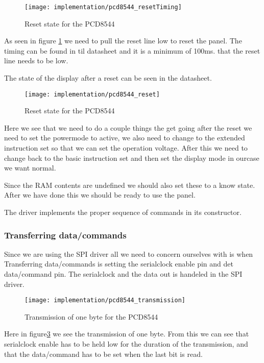 \begin{figure}
	\centering
	\texttt{[image: implementation/pcd8544\_resetTiming]}
	\caption{Reset state for the PCD8544\cite[p. 21]{philips:pcd8544}}
	\label{fig:pcd8544_resetTiming}
\end{figure}

As seen in figure \ref{fig:pcd8544_resetTiming} we need to pull the reset line low to reset the panel.
The timing can be found in til datasheet and it is a minimum of 100ms. that the reset line needs to be low.


The state of the display after a reset can be seen in the datasheet.

\begin{figure}
	\centering
	\texttt{[image: implementation/pcd8544\_reset]}
	\caption{Reset state for the PCD8544\cite[p. 15]{philips:pcd8544}}
	\label{fig:pcd8544_reset}
\end{figure}

Here we see that we need to do a couple things the get going after the reset we need to set the powermode to active,
we also need to change to the extended instruction set so that we can set the operation voltage.
After this we need to change back to the basic instruction set and then set the display mode in ourcase we want normal.

Since the RAM contents are undefined we should also set these to a know state.
After we have done this we should be ready to use the panel.

The driver implements the proper sequence of commands in its constructor.

\subsubsection{Transferring data/commands}
Since we are using the SPI driver all we need to concern ourselves with is when Transferring data/commands is setting the serialclock enable pin and det data/command pin.
The serialclock and the data out is handeled in the SPI driver.

\begin{figure}
	\centering
	\texttt{[image: implementation/pcd8544\_transmission]}
	\caption{Transmission of one byte for the PCD8544\cite[p. 12]{philips:pcd8544}}
	\label{fig:pcd8544_transmission}
\end{figure}

Here in figure\ref{fig:pcd8544_transmission} we see the transmission of one byte.
From this we can see that serialclock enable has to be held low for the duration of the transmission,
and that the data/command has to be set when the last bit is read.


